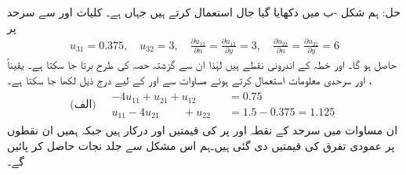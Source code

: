 حل:\quad
ہم شکل -ب میں دکھایا گیا جال استعمال کرتے ہیں جہاں  ہے۔ کلیات  اور  سے  سرحد پر
\begin{align}\label{مساوات_اعدادی_مخلوط_سرحدی_الف}
u_{31}=0.375,\quad u_{32}=3,\quad \frac{\partial u_{12}}{\partial n}=\frac{\partial u_{12}}{\partial y}=3,\quad \frac{\partial u_{22}}{\partial n}=\frac{\partial u_{22}}{\partial y}=6
\end{align}
حاصل ہو گا۔  اور  خطہ  کے اندرونی نقطے ہیں لہٰذا ان سے گزشتہ حصہ  کی طرح برتا جا سکتا ہے۔ یقیناً ،   اور سرحدی معلومات استعمال کرتے ہوئے مساوات   سے  اور  کے لیے درج ذیل لکھا جا سکتا ہے۔
\begin{gather}
\text{(الف)}\quad 
\begin{aligned}\label{مساوات_اعدادی_مخلوط_سرحدی_ب}
-4u_{11}+u_{21}+u_{12}\phantom{+u_{21}}&=0.75\\
u_{11}-4u_{21}\phantom{+u_{21}}+u_{22}&=1.5-0.375=1.125
\end{aligned}
\end{gather}
ان مساوات میں سرحد کے نقطہ  اور  پر  کی قیمتیں  اور  درکار ہیں جبکہ ہمیں ان نقطوں پر عمودی تفرق  کی قیمتیں دی گئی ہیں۔ہم اس مشکل سے جلد نجات حاصل کر پائیں گے۔

